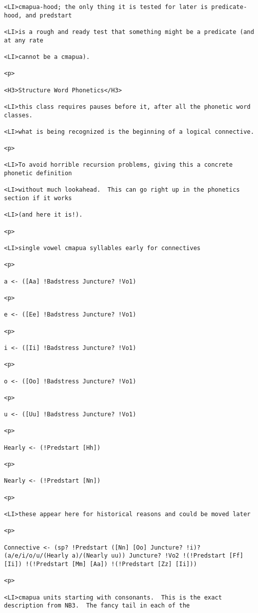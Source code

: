 \documentclass[12pt]{article}
\begin{document}
\begin{lstlisting}
<LI>cmapua-hood; the only thing it is tested for later is predicate-hood, and predstart

<LI>is a rough and ready test that something might be a predicate (and at any rate

<LI>cannot be a cmapua).

<p>

<H3>Structure Word Phonetics</H3>

<LI>this class requires pauses before it, after all the phonetic word classes.

<LI>what is being recognized is the beginning of a logical connective.

<p>

<LI>To avoid horrible recursion problems, giving this a concrete phonetic definition

<LI>without much lookahead.  This can go right up in the phonetics section if it works

<LI>(and here it is!).

<p>

<LI>single vowel cmapua syllables early for connectives

<p>

a <- ([Aa] !Badstress Juncture? !Vo1)

<p>

e <- ([Ee] !Badstress Juncture? !Vo1)

<p>

i <- ([Ii] !Badstress Juncture? !Vo1)

<p>

o <- ([Oo] !Badstress Juncture? !Vo1)

<p>

u <- ([Uu] !Badstress Juncture? !Vo1)

<p>

Hearly <- (!Predstart [Hh])

<p>

Nearly <- (!Predstart [Nn])

<p>

<LI>these appear here for historical reasons and could be moved later

<p>

Connective <- (sp? !Predstart ([Nn] [Oo] Juncture? !i)? (a/e/i/o/u/(Hearly a)/(Nearly uu)) Juncture? !Vo2 !(!Predstart [Ff] [Ii]) !(!Predstart [Mm] [Aa]) !(!Predstart [Zz] [Ii]))

<p>

<LI>cmapua units starting with consonants.  This is the exact description from NB3.  The fancy tail in each of the


\end{lstlisting}
\end{document}
